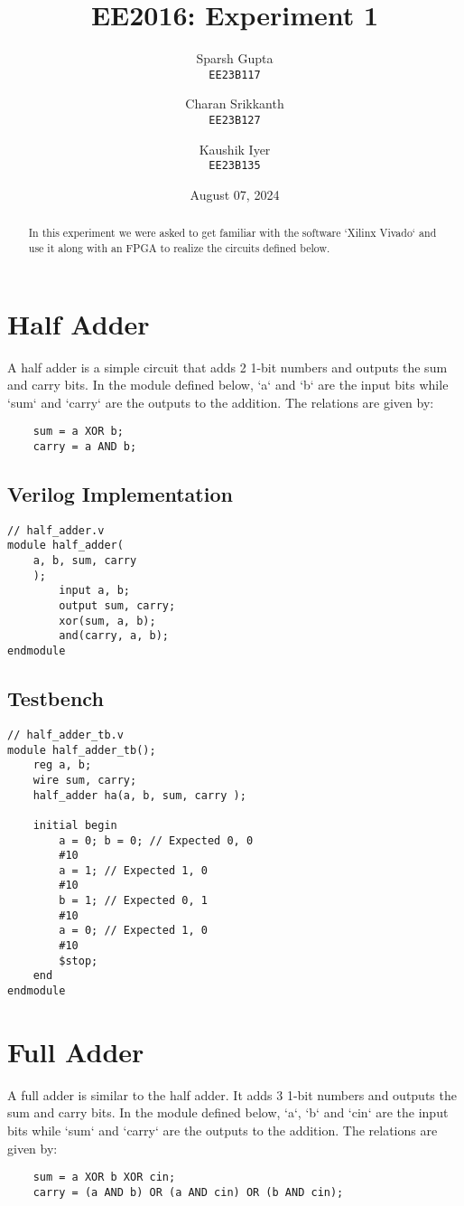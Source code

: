 \documentclass[a4paper]{article}
\title{EE2016: Experiment 1}
\author{
  Sparsh Gupta\\
  \texttt{EE23B117}
  \and
  Charan Srikkanth\\
  \texttt{EE23B127}
  \and
  Kaushik Iyer\\
  \texttt{EE23B135}
}
\date{August 07, 2024}
\begin{document}
\maketitle

\begin{abstract}
In this experiment we were asked to get familiar with the software `Xilinx Vivado` and use it along with an FPGA to realize the circuits defined below.
\end{abstract}

\section{Half Adder}
A half adder is a simple circuit that adds 2 1-bit numbers and outputs the sum and carry bits.
In the module defined below, `a` and `b` are the input bits while `sum` and `carry` are the outputs to the addition.
The relations are given by:
\begin{verbatim}
    sum = a XOR b;
    carry = a AND b;
\end{verbatim}
\subsection{Verilog Implementation}
\begin{verbatim}
// half_adder.v
module half_adder(
    a, b, sum, carry
    );
        input a, b;
        output sum, carry;
        xor(sum, a, b);
        and(carry, a, b);
endmodule
\end{verbatim}
\subsection{Testbench}
\begin{verbatim}
// half_adder_tb.v
module half_adder_tb();
    reg a, b;
    wire sum, carry;
    half_adder ha(a, b, sum, carry );
    
    initial begin
        a = 0; b = 0; // Expected 0, 0
        #10
        a = 1; // Expected 1, 0
        #10
        b = 1; // Expected 0, 1
        #10
        a = 0; // Expected 1, 0
        #10
        $stop;
    end
endmodule
\end{verbatim}

\pagebreak
\section{Full Adder}
A full adder is similar to the half adder. It adds 3 1-bit numbers and outputs the sum and carry bits.
In the module defined below, `a`, `b` and `cin` are the input bits while `sum` and `carry` are the outputs to the addition.
The relations are given by:
\begin{verbatim}
    sum = a XOR b XOR cin;
    carry = (a AND b) OR (a AND cin) OR (b AND cin);
\end{verbatim}
\end{document}
